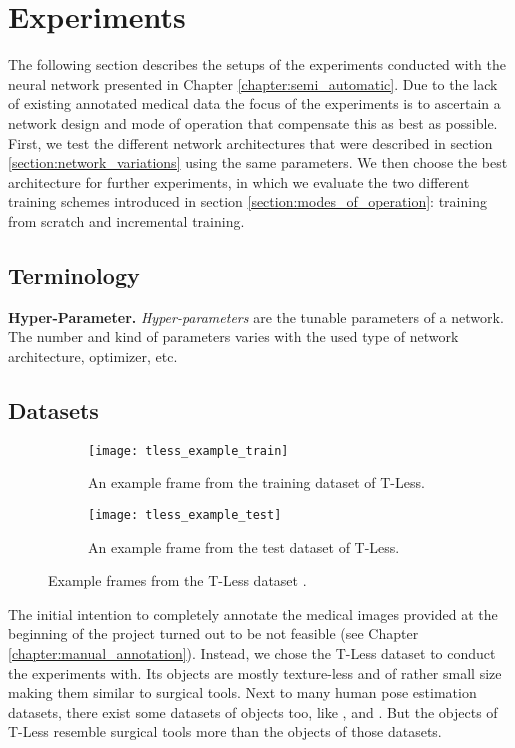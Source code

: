 \chapter{Experiments} \label{chapter:experiments}

The following section describes the setups of the experiments conducted with the neural network presented in Chapter \ref{chapter:semi_automatic}. Due to the lack of existing annotated medical data the focus of the experiments is to ascertain a network design and mode of operation that compensate this as best as possible. First, we test the different network architectures that were described in section \ref{section:network_variations} using the same parameters. We then choose the best architecture for further experiments, in which we evaluate the two different training schemes introduced in section \ref{section:modes_of_operation}: training from scratch and incremental training.

\section{Terminology}

\noindent\textbf{Hyper-Parameter.} \textit{Hyper-parameters} are the tunable parameters of a network. The number and kind of parameters varies with the used type of network architecture, optimizer, etc.

\section{Datasets}

\begin{figure}[!tbp]
	\centering
	\begin{subfigure}[t]{0.47\textwidth}
		\centering
    	\texttt{[image: tless\_example\_train]}
    	\caption{An example frame from the training dataset of T-Less.}
    	\label{fig:tless_example_train}
	\end{subfigure}
	\hfill
	\begin{subfigure}[t]{0.47\textwidth}
		\centering
    	\texttt{[image: tless\_example\_test]}
    	\caption{An example frame from the test dataset of T-Less.}
    	\label{fig:tless_example_test}
	\end{subfigure}
	\caption{Example frames from the T-Less dataset \cite{tless}.}
	\label{fig:tless_examples}
\end{figure}

The initial intention to completely annotate the medical images provided at the beginning of the project turned out to be not feasible (see Chapter \ref{chapter:manual_annotation}). Instead, we chose the T-Less dataset to conduct the experiments with. Its objects are mostly texture-less  and of rather small size making them similar to surgical tools. Next to many human pose estimation datasets, there exist some datasets of objects too, like \cite{next_view_dataset}, \cite{pracsys_dataset} and \cite{rigid_body_dataset}. But the objects of T-Less resemble surgical tools more than the objects of those datasets.


